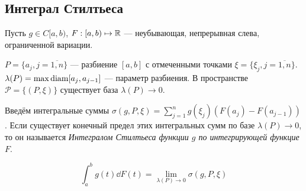 \subsection{Интеграл
Стилтьеса}\label{ux438ux43dux442ux435ux433ux440ux430ux43b-ux441ux442ux438ux43bux442ux44cux435ux441ux430}

Пусть \(g\in C[a,b)\), \(F:[a,b)\mapsto \mathbb R\) --- неубывающая,
непрерывная слева, ограниченной вариации.

\(P = \{a_j, j=\overline{1,n}\}\) --- разбиение \([a,b]\) с отмеченными
точками \(\xi = \{\xi_j, j=\overline{1,n}\}\).
\(\lambda(P) = \max\mathrm{diam} [a_j, a_{j-1}]\) --- параметр разбиения. В
пространстве \(\mathcal P = \{ (P, \xi) \}\) существует база
\(\lambda(P)\to 0\).

Введём интегральные суммы
\(\sigma(g,P,\xi) = \sum_{j=1}^n g(\xi_j) (F(a_j) - F(a_{j-1}))\). Если
существует конечный предел этих интегральных сумм по базе
\(\lambda(P)\to 0\), то он называется \emph{Интегралом Стилтьеса функции
\(g\) по интегрирующей функцие \(F\)}.

\[ \int_a^b g(t) \dd F(t) = \lim\limits_{\lambda(P)\to 0} \sigma(g, P, \xi) \]
